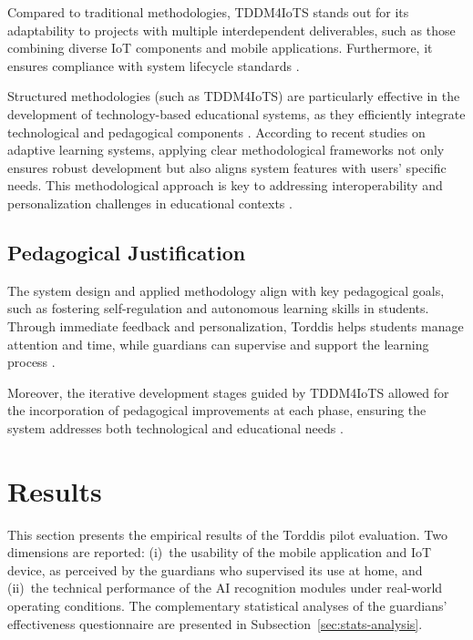                 Compared to traditional methodologies, TDDM4IoTS stands out for its adaptability to projects with multiple interdependent deliverables, such as those combining diverse IoT components and mobile applications. Furthermore, it ensures compliance with system lifecycle standards \citep{Guerrero2023Agile,ISO-IEC-IEEE12207-2017,ISO-IEC-IEEE12207-2017Application}.
                
                Structured methodologies (such as TDDM4IoTS) are particularly effective in the development of technology-based educational systems, as they efficiently integrate technological and pedagogical components \citep{Borte2024Learning,Kirkwood2014Technology}. According to recent studies on adaptive learning systems, applying clear methodological frameworks not only ensures robust development but also aligns system features with users’ specific needs. This methodological approach is key to addressing interoperability and personalization challenges in educational contexts \citep{Wang2025Development}.
                
                \subsection{Pedagogical Justification}
                The system design and applied methodology align with key pedagogical goals, such as fostering self-regulation and autonomous learning skills in students. Through immediate feedback and personalization, Torddis helps students manage attention and time, while guardians can supervise and support the learning process \citep{Chen2025Unpacking}.
                
                Moreover, the iterative development stages guided by TDDM4IoTS allowed for the incorporation of pedagogical improvements at each phase, ensuring the system addresses both technological and educational needs \citep{Huang2025How}.
                
                \section{Results}
                \label{section:sixth}
                This section presents the empirical results of the Torddis pilot evaluation. Two dimensions are reported: (i)~the usability of the mobile application and IoT device, as perceived by the guardians who supervised its use at home, and (ii)~the technical performance of the AI recognition modules under real-world operating conditions. The complementary statistical analyses of the guardians' effectiveness questionnaire are presented in Subsection~\ref{sec:stats-analysis}.
